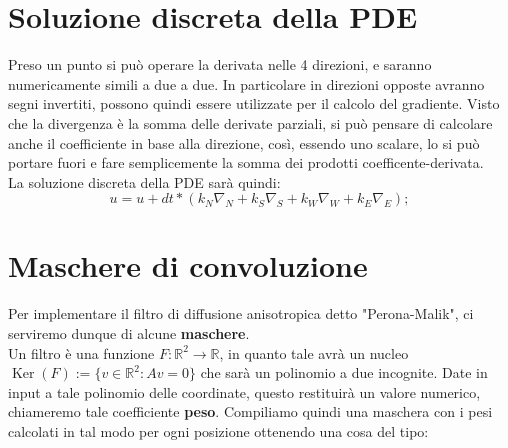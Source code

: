 \newpage
\section{Soluzione discreta della PDE}
Preso un punto si può operare la derivata nelle 4 direzioni, e saranno numericamente simili a due a due. In particolare in direzioni opposte avranno segni invertiti, possono quindi essere utilizzate per il calcolo del gradiente.
Visto che la divergenza è la somma delle derivate parziali, si può pensare di calcolare anche il coefficiente in base alla direzione, così, essendo uno scalare, lo si può portare fuori e fare semplicemente la somma dei prodotti coefficente-derivata.\\
La soluzione discreta della PDE sarà quindi:\\
$$
u = u + dt*(k_N\nabla_N + k_S\nabla_S + k_W\nabla_W + k_E\nabla_E );
$$
 

\section{Maschere di convoluzione}
Per implementare il filtro di diffusione anisotropica detto "Perona-Malik", ci serviremo dunque di alcune \textbf{maschere}.\\
Un filtro è una funzione $F:\mathbb R^2\to\mathbb R$, in quanto tale avrà un nucleo $\operatorname{Ker}(F):=\{v \in \mathbb R^2: Av=0\}$ che sarà un polinomio a due incognite. Date in input a tale polinomio delle coordinate, questo restituirà un valore numerico, chiameremo tale coefficiente \textbf{peso}. Compiliamo quindi una maschera con i pesi calcolati in tal modo per ogni posizione ottenendo una cosa del tipo:

